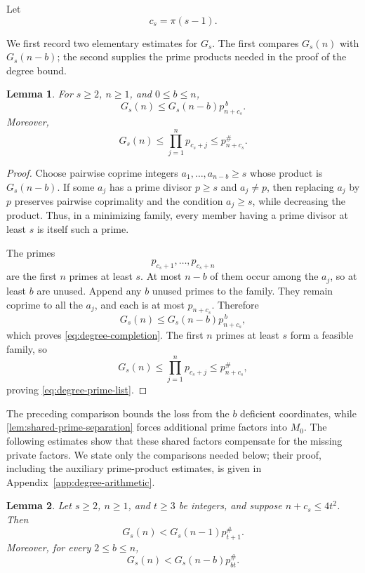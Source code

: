\documentclass[11pt,onecolumn]{IEEEtran}
\newtheorem{lemma}{Lemma}
\newcommand{\primorial}[1]{p_{#1}^{\#}}
\begin{document}
Let
\[
c_s=\pi(s-1).
\]

We first record two elementary estimates for $G_s$.  The first compares
$G_s(n)$ with $G_s(n-b)$; the second supplies the prime products needed
in the proof of the degree bound.

\begin{lemma}
\label{lem:degree-completion}
For $s\ge2$, $n\ge1$, and $0\le b\le n$,
\begin{equation}
G_s(n)\le G_s(n-b)p_{n+c_s}^{\,b}.
\label{eq:degree-completion}
\end{equation}
Moreover,
\begin{equation}
G_s(n)\le\prod_{j=1}^{n}p_{c_s+j}\le \primorial{n+c_s}.
\label{eq:degree-prime-list}
\end{equation}
\end{lemma}

\begin{proof}
Choose pairwise coprime integers $a_1,\ldots,a_{n-b}\ge s$ whose
product is $G_s(n-b)$.  If some $a_j$ has a prime divisor $p\ge s$ and
$a_j\ne p$, then replacing $a_j$ by $p$ preserves pairwise coprimality
and the condition $a_j\ge s$, while decreasing the product.  Thus, in
a minimizing family, every member having a prime divisor at least $s$
is itself such a prime.

The primes
\[
p_{c_s+1},\ldots,p_{c_s+n}
\]
are the first $n$ primes at least $s$.  At most $n-b$ of them occur
among the $a_j$, so at least $b$ are unused.  Append any $b$ unused
primes to the family.  They remain coprime to all the $a_j$, and each
is at most $p_{n+c_s}$.  Therefore
\[
G_s(n)\le G_s(n-b)p_{n+c_s}^{\,b},
\]
which proves \eqref{eq:degree-completion}.  The first
$n$ primes at least $s$ form a feasible family, so
\[
G_s(n)\le\prod_{j=1}^np_{c_s+j}\le \primorial{n+c_s},
\]
proving \eqref{eq:degree-prime-list}.
\end{proof}

The preceding comparison bounds the loss from the $b$ deficient
coordinates, while \cref{lem:shared-prime-separation} forces additional
prime factors into $M_0$.  The following estimates show that
these shared factors compensate for the missing private factors.  We state only the comparisons needed below; their proof, including
the auxiliary prime-product estimates, is given in
Appendix~\ref{app:degree-arithmetic}.

\begin{lemma}
\label{lem:elementary-prime-product}
Let $s\ge2$, $n\ge1$, and $t\ge3$ be integers, and suppose
$n+c_s\le4t^2$. Then
\begin{equation}
G_s(n)<G_s(n-1)\primorial{t+1}.
\label{eq:completion-one}
\end{equation}
Moreover, for every $2\le b\le n$,
\begin{equation}
G_s(n)<G_s(n-b)\primorial{bt}.
\label{eq:completion-many}
\end{equation}
\end{lemma}
\end{document}

